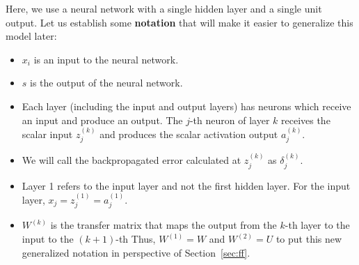 \documentclass{tufte-handout}
\begin{document}
Here, we use a neural network with a single hidden layer and a single unit output. Let us establish some \textbf{notation} that will make it easier to generalize this model later:
\begin{itemize}
\item $x_i$ is an input to the neural network.
\item $s$ is the output of the neural network.
\item Each layer (including the input and output layers) has neurons which receive an input and produce an output. The $j$-th neuron of layer $k$ receives the scalar input $z_j^{(k)}$ and produces the scalar activation output $a_j^{(k)}$.
\item We will call the backpropagated error calculated at $z_j^{(k)}$ as $\delta_j^{(k)}$. 
\item Layer 1 refers to the input layer and not the first hidden layer. For the input layer, $x_j = z_j^{(1)} = a_j^{(1)}$.
\item $W^{(k)}$ is the transfer matrix that maps the output from the $k$-th layer to the input to the  $(k+1)$-th Thus, $W^{(1)} = W$ and $W^{(2)} = U$ to put this new generalized notation in perspective of Section~\ref{sec:ff}.
\end{itemize}

\end{document}
